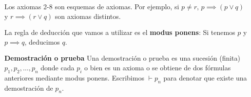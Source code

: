 Los axiomas 2-8 son esquemas de axiomas. Por ejemplo, si $p\neq r$, $p\implies (p\vee q)$ y $r\implies (r\vee q)$ son axiomas distintos.

La regla de deducción que vamos a utilizar es el \textbf{modus ponens}: Si tenemos $p$ y $p\implies q$, deducimos $q$.

\begin{defn}{\textbf{Demostración o prueba}}
	Una demostración o prueba es una sucesión (finita) $p_1, p_2, \hdots, p_n$ donde cada $p_i$ o bien es un axioma o se obtiene de dos fórmulas anteriores mediante modus ponens.
	Escribimos $\vdash p_n$ para denotar que existe una demostración de $p_n$.
\end{defn}

